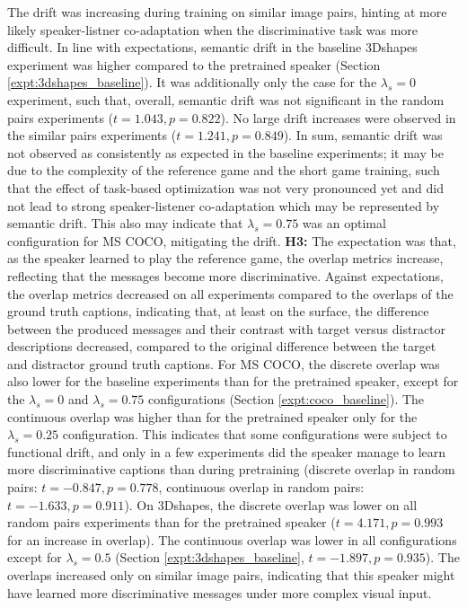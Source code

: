 The drift was increasing during training on similar image pairs, hinting at more likely speaker-listner co-adaptation when the discriminative task was more difficult.
In line with expectations, semantic drift in the baseline 3Dshapes experiment was higher compared to the pretrained speaker (Section \ref{expt:3dshapes_baseline}). It was additionally only the case for the $\lambda_s=0$ experiment, such that, overall, semantic drift was not significant in the random pairs experiments ($t = 1.043, p = 0.822$). No large drift increases were observed in the similar pairs experiments ($t=1.241, p= 0.849$). 
In sum, semantic drift was not observed as consistently as expected in the baseline experiments; it may be due to the complexity of the reference game and the short game training, such that the effect of task-based optimization was not very pronounced yet and did not lead to strong speaker-listener co-adaptation which may be represented by semantic drift. This also may indicate that $\lambda_s=0.75$ was an optimal configuration for MS COCO, mitigating the drift.\newline
\textbf{H3:} The expectation was that, as the speaker learned to play the reference game, the overlap metrics increase, reflecting that the messages become more discriminative. Against expectations, the overlap metrics decreased on all experiments compared to the overlaps of the ground truth captions, indicating that, at least on the surface, the difference between the produced messages and their contrast with target versus distractor descriptions decreased, compared to the original difference between the target and distractor ground truth captions. For MS COCO, the discrete overlap was also lower for the baseline experiments than for the pretrained speaker, except for the $\lambda_s = 0$ and $\lambda_s = 0.75$ configurations (Section \ref{expt:coco_baseline}). The continuous overlap was higher than for the pretrained speaker only for the $\lambda_s = 0.25$ configuration. This indicates that some configurations were subject to functional drift, and only in a few experiments did the speaker manage to learn more discriminative captions than during pretraining (discrete overlap in random pairs: $t = -0.847, p =0.778$, continuous overlap in random pairs: $t = -1.633, p = 0.911$).
On 3Dshapes, the discrete overlap was lower on all random pairs experiments than for the pretrained speaker ($t = 4.171, p = 0.993$ for an increase in overlap). The continuous overlap was lower in all configurations except for $\lambda_s=0.5$ (Section \ref{expt:3dshapes_baseline}, $t = -1.897, p = 0.935$). The overlaps increased only on similar image pairs, indicating that this speaker might have learned more discriminative messages under more complex visual input.
